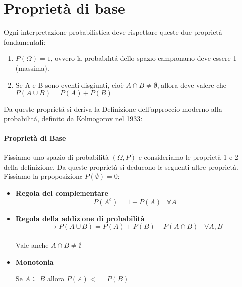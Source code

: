 \section{Proprietà di base} 
Ogni interpretazione probabilistica deve rispettare queste due proprietà fondamentali:
\begin{enumerate}
    \item $P(\Omega) = 1$, ovvero la probabilitá dello spazio campionario deve essere 1 (massima).
    \item Se A e B sono eventi disgiunti, cioè $A \cap B \neq \emptyset$, allora deve valere che $P (A \cup B) = P(A) + P(B)$
\end{enumerate}
Da queste proprietá si deriva la Definizione dell'approccio moderno alla probabilitá, definito da Kolmogorov nel 1933:


\paragraph{Proprietà di Base}
Fissiamo uno spazio di probabilità $(\Omega, P)$ e consideriamo le proprietà 1 e 2 della definizione.
Da queste proprietà si deducono le seguenti altre proprietà.
\\Fissiamo la prpoposizione $P(\emptyset) = 0$:
\begin{itemize}
    \item \textbf{Regola del complementare} 
    $$P(A^c) = 1 - P(A) \;\;\;\forall A$$
    \item \textbf{Regola della addizione di probabilità} 
    $$\to P(A \cup B) = P(A) + P(B) - P(A \cap B)  \;\;\;\forall A,B$$
    \\ Vale anche $A \cap B \neq \emptyset$
    \item \textbf{Monotonia}
    \begin{center}
        Se $A \subseteq B$ allora $P(A) <= P(B)$
    \end{center}
\end{itemize}
